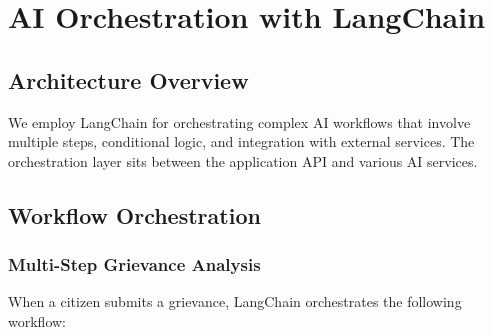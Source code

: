 \documentclass[12pt,a4paper]{article}
\begin{document}
\section{AI Orchestration with LangChain}

\subsection{Architecture Overview}

We employ LangChain for orchestrating complex AI workflows that involve multiple steps, conditional logic, and integration with external services. The orchestration layer sits between the application API and various AI services.

\subsection{Workflow Orchestration}

\subsubsection{Multi-Step Grievance Analysis}

When a citizen submits a grievance, LangChain orchestrates the following workflow:
\end{document}
